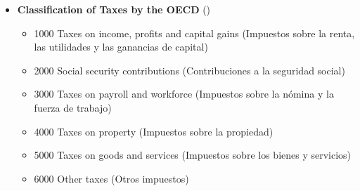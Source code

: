 \documentclass[
  ignorenonframetext,
  english,
]{beamer}
\providecommand{\tightlist}{%
  \setlength{\itemsep}{0pt}\setlength{\parskip}{0pt}}\usepackage{longtable,booktabs,array}
\begin{document}
\begin{frame}{}
\label{section-14}
\begin{itemize}
\item
  \textbf{Classification of Taxes by the OECD}
  ()

  \begin{itemize}
  \tightlist
  \item
    1000 Taxes on income, profits and capital gains (Impuestos sobre la
    renta, las utilidades y las ganancias de capital)
  \item
    2000 Social security contributions (Contribuciones a la seguridad
    social)
  \item
    3000 Taxes on payroll and workforce (Impuestos sobre la nómina y la
    fuerza de trabajo)
  \item
    4000 Taxes on property (Impuestos sobre la propiedad)
  \item
    5000 Taxes on goods and services (Impuestos sobre los bienes y
    servicios)
  \item
    6000 Other taxes (Otros impuestos)
  \end{itemize}
\end{itemize}
\end{frame}
\end{document}
